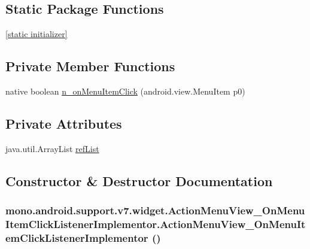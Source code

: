 \subsection*{Static Package Functions}
\begin{CompactItemize}
\item 
\hyperlink{classmono_1_1android_1_1support_1_1v7_1_1widget_1_1_action_menu_view___on_menu_item_click_listener_implementor_4bca19c7d0207239d8c40b265e45af8a}{\mbox{[}static initializer\mbox{]}}
\end{CompactItemize}
\subsection*{Private Member Functions}
\begin{CompactItemize}
\item 
native boolean \hyperlink{classmono_1_1android_1_1support_1_1v7_1_1widget_1_1_action_menu_view___on_menu_item_click_listener_implementor_3dca93d71ee89eef85983b160f3b2554}{n\_\-onMenuItemClick} (android.view.MenuItem p0)
\end{CompactItemize}
\subsection*{Private Attributes}
\begin{CompactItemize}
\item 
java.util.ArrayList \hyperlink{classmono_1_1android_1_1support_1_1v7_1_1widget_1_1_action_menu_view___on_menu_item_click_listener_implementor_366b7365107c33ee2717b225132fc60b}{refList}
\end{CompactItemize}


\subsection{Constructor \& Destructor Documentation}
\hypertarget{classmono_1_1android_1_1support_1_1v7_1_1widget_1_1_action_menu_view___on_menu_item_click_listener_implementor_ccf13daa01c9bffe77664d8a4a92bd91}{
\subsubsection[{ActionMenuView\_\-OnMenuItemClickListenerImplementor}]{\setlength{\rightskip}{0pt plus 5cm}mono.android.support.v7.widget.ActionMenuView\_\-OnMenuItemClickListenerImplementor.ActionMenuView\_\-OnMenuItemClickListenerImplementor ()}}
\label{classmono_1_1android_1_1support_1_1v7_1_1widget_1_1_action_menu_view___on_menu_item_click_listener_implementor_ccf13daa01c9bffe77664d8a4a92bd91}




